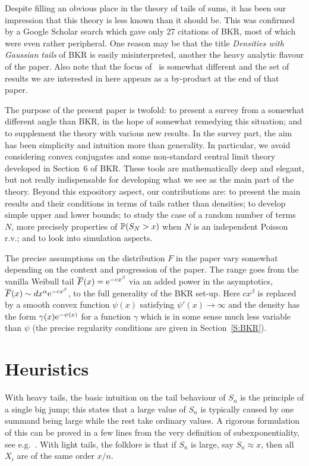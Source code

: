 Despite filling an obvious place in the theory of  tails of sums, it has been our impression that this theory is less known
than it should be. This was confirmed by a Google Scholar search which gave only 27 citations of BKR,
most of which were even rather peripheral.
One reason may be that the title \emph{Densities with Gaussian tails} of BKR is easily misinterpreted,
another the heavy analytic flavour of the paper. Also note that the focus of~\cite{rootzen1987ratio} is somewhat different and
the set of results we are interested in here appears as a by-product at the end of that paper.

The purpose of the present paper is twofold: to present a survey from a somewhat different angle than BKR, in the 
hope of somewhat remedying this situation; and to supplement the theory with various new results.
In the survey part, the aim has been  simplicity and intuition more than generality.
In particular, we avoid considering convex conjugates and some non-standard
central limit theory developed in Section~6 of BKR. These tools are mathematically deep and elegant, but
not really indispensable for developing what we see as the main part of the theory.
Beyond this expository aspect, our contributions are: to present the main results and their conditions
in terms of  tails rather than densities;  to develop simple upper and lower
bounds; to study the case of a random
number of terms $N$, more precisely properties of $\operatorname{{\mathbb P}}(S_N>x)$
when $N$ is an independent Poisson r.v.; and to look into simulation
aspects.

The precise assumptions on the distribution $F$ in the paper vary somewhat depending on the context and progression of
the paper. The range goes from the vanilla Weibull tail $\overline F(x)=\mathrm{e}^{-cx^\beta}$ via an added power in the asymptotics,
$\overline F(x)\sim dx^{\alpha}\mathrm{e}^{-cx^\beta}$, to the full generality of the BKR set-up. Here $cx^\beta$ is replaced by a smooth convex
function $\psi(x)$ satisfying $\psi'(x)\to\infty$ and the density has the form $\gamma(x)\mathrm{e}^{-\psi(x)}$ for a function $\gamma$ which
is in some sense much less variable than $\psi$ (the precise regularity conditions are given in Section~\ref{S:BKR}).

\section{Heuristics}\label{S:Heur}

With heavy tails, the basic intuition on the tail behaviour of $S_n$ is the principle of
a single big jump; this states that a large value of $S_n$ is typically caused by
one summand being large while the rest take ordinary values.
A rigorous formulation of this can be proved in a few lines from the very definition
of subexponentiality, see e.g.~\cite[p.\,294]{asmussen2010ruin}. With light tails, the folklore is that if
$S_n$ is large, say $S_n\approx x$, then all $X_i$ are of the same order $x/n$.


